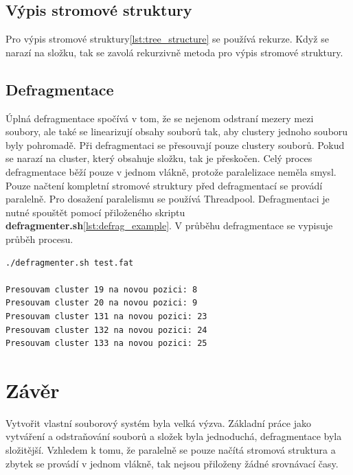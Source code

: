 \documentclass{report}
\begin{document}
\section*{Výpis stromové struktury}
Pro výpis stromové struktury\ref{lst:tree_structure} se používá rekurze. Když se narazí na složku, tak se zavolá rekurzivně metoda pro výpis stromové struktury.


\section*{Defragmentace}
Úplná defragmentace spočívá v tom, že se nejenom odstraní mezery mezi soubory, ale také se linearizují obsahy souborů tak, aby clustery jednoho souboru byly pohromadě.
Při defragmentaci se přesouvají pouze clustery souborů. Pokud se narazí na cluster, který obsahuje složku, tak je přeskočen. Celý proces defragmentace běží pouze v jednom vlákně, protože paralelizace neměla smysl. Pouze načtení kompletní stromové struktury před defragmentací se provádí paralelně. Pro dosažení paralelismu se používá Threadpool. Defragmentaci je nutné spouštět pomocí přiloženého skriptu \textbf{defragmenter.sh}\ref{lst:defrag_example}. V průběhu defragmentace se vypisuje průběh procesu.
\begin{lstlisting}[caption=Spuštění defragmentace,label=lst:defrag_example, language={}]
./defragmenter.sh test.fat

Presouvam cluster 19 na novou pozici: 8
Presouvam cluster 20 na novou pozici: 9
Presouvam cluster 131 na novou pozici: 23
Presouvam cluster 132 na novou pozici: 24
Presouvam cluster 133 na novou pozici: 25

 \end{lstlisting}

\chapter*{Závěr}
Vytvořit vlastní souborový systém byla velká výzva. Základní práce jako vytváření a odstraňování souborů a složek byla jednoduchá, defragmentace byla složitější. Vzhledem k tomu, že paralelně se pouze načítá stromová struktura a zbytek se provádí v jednom vlákně, tak nejsou přiloženy žádné srovnávací časy.
\end{document}
